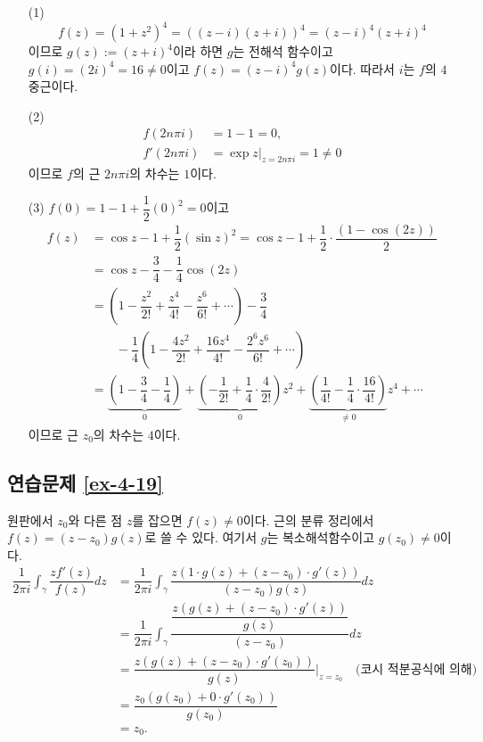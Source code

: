 \begin{itemize}
\item[(1)] 
\[f(z) = (1+z^2)^4 = ((z-i)(z+i))^4
= (z-i)^4(z+i)^4
\]
이므로 $g(z):= (z+i)^4$이라 하면
$g$는 전해석 함수이고 $g(i) = (2i)^4 = 16\ne 0$이고
$f(z) = (z-i)^4 g(z)$이다. 
따라서 $i$는 $f$의 $4$중근이다.
\item[(2)] 
\begin{align*}
f(2n\pi i) &= 1 - 1 = 0, \\
f'(2n\pi i) &= \exp z \Big|_{z=2n\pi i} = 1 \ne 0
\end{align*}
이므로  $f$의 근 $2n\pi i$의 차수는 $1$이다.
\item[(3)] $f(0)  = 1 - 1 + \dfrac12(0)^2 = 0$이고
\begin{align*}
f(z) &= \cos z - 1 + \dfrac12(\sin z)^2 = \cos z - 1 + \dfrac12 \cdot \dfrac{(1-\cos(2z))}2 \\
&= \cos z - \dfrac34 - \dfrac14\cos(2z) \\
&= \left( 1 - \dfrac{z^2}{2!} + \dfrac{z^4}{4!} - \dfrac{z^6}{6!} + \cdots \right)- \dfrac 34 \\
& \qquad -\dfrac14\left( 1 - \dfrac{4z^2}{2!} + \dfrac{16z^4}{4!} 
- \dfrac{2^6z^6}{6!} + \cdots \right) \\
&= \underbrace{\left(1-\dfrac34-\dfrac14\right)}_{0}
+ \underbrace{\left(-\dfrac1{2!} +\dfrac14\cdot\dfrac 4{2!}\right)}_{0} z^2
+ \underbrace{\left(\dfrac1{4!} - \dfrac14\cdot\dfrac {16}{4!}\right)}_{\ne 0} z^4 + \cdots
\end{align*}
이므로 근 $z_0$의 차수는 $4$이다.
\end{itemize}

\subsection*{연습문제 \ref{ex-4-19}}

원판에서 $z_0$와 다른 점 $z$를 잡으면 $f(z)\ne0$이다.
근의 분류 정리에서 $f(z)=(z-z_0)g(z)$로 쓸 수 있다.
여기서 $g$는 복소해석함수이고 $g(z_0)\ne0$이다.
\begin{align*}
\dfrac1{2\pi i}\int_\gamma \dfrac{zf'(z)}{f(z)}dz 
&= \dfrac1{2\pi i}\int_\gamma \dfrac{z(1\cdot g(z) + (z-z_0)\cdot g'(z))}{(z-z_0)g(z)}dz  \\
&= \dfrac1{2\pi i}\int_\gamma \dfrac{\dfrac{z(g(z) + (z-z_0)\cdot g'(z))}{g(z)}}{(z-z_0)}dz  \\
&= \dfrac{z(g(z) + (z-z_0)\cdot g'(z_0))}{g(z)}\Big|_{z=z_0} 
\quad\text{(코시 적분공식에 의해)} \\
&= \dfrac{z_0(g(z_0) + 0\cdot g'(z_0))}{g(z_0)} \\
&= z_0.
\end{align*}

